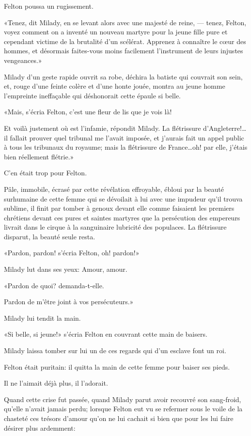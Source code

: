 Felton poussa un rugissement. 

«Tenez, dit Milady, en se levant alors avec une majesté de reine, --- tenez, Felton, voyez comment on a inventé un nouveau martyre pour la jeune fille pure et cependant victime de la brutalité d'un scélérat. Apprenez à connaître le cœur des hommes, et désormais faites-vous moins facilement l'instrument de leurs injustes vengeances.» 

Milady d'un geste rapide ouvrit sa robe, déchira la batiste qui couvrait son sein, et, rouge d'une feinte colère et d'une honte jouée, montra au jeune homme l'empreinte ineffaçable qui déshonorait cette épaule si belle. 

«Mais, s'écria Felton, c'est une fleur de lis que je vois là! 

\speak  Et voilà justement où est l'infamie, répondit Milady. La flétrissure d'Angleterre!\dots il fallait prouver quel tribunal me l'avait imposée, et j'aurais fait un appel public à tous les tribunaux du royaume; mais la flétrissure de France\dots oh! par elle, j'étais bien réellement flétrie.» 

C'en était trop pour Felton. 

Pâle, immobile, écrasé par cette révélation effroyable, ébloui par la beauté surhumaine de cette femme qui se dévoilait à lui avec une impudeur qu'il trouva sublime, il finit par tomber à genoux devant elle comme faisaient les premiers chrétiens devant ces pures et saintes martyres que la persécution des empereurs livrait dans le cirque à la sanguinaire lubricité des populaces. La flétrissure disparut, la beauté seule resta. 

«Pardon, pardon! s'écria Felton, oh! pardon!» 

Milady lut dans ses yeux: Amour, amour. 

«Pardon de quoi? demanda-t-elle. 

\speak  Pardon de m'être joint à vos persécuteurs.» 

Milady lui tendit la main. 

«Si belle, si jeune!» s'écria Felton en couvrant cette main de baisers. 

Milady laissa tomber sur lui un de ces regards qui d'un esclave font un roi. 

Felton était puritain: il quitta la main de cette femme pour baiser ses pieds. 

Il ne l'aimait déjà plus, il l'adorait. 

Quand cette crise fut passée, quand Milady parut avoir recouvré son sang-froid, qu'elle n'avait jamais perdu; lorsque Felton eut vu se refermer sous le voile de la chasteté ces trésors d'amour qu'on ne lui cachait si bien que pour les lui faire désirer plus ardemment: 

